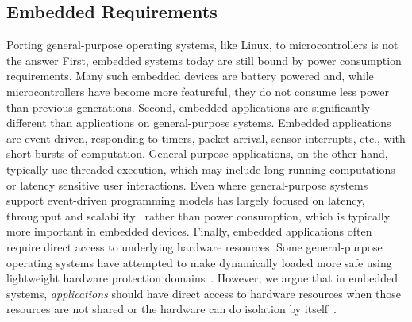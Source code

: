 \subsection{Embedded Requirements}
\label{sec:os:execution}

Porting general-purpose operating systems, like Linux, to microcontrollers is
not the answer First, embedded systems today are still bound by power
consumption requirements. Many such embedded devices are battery powered and,
while microcontrollers have become more featureful, they do not consume less
power than previous generations.  Second, embedded applications are
significantly different than applications on general-purpose systems. Embedded
applications are event-driven, responding to timers, packet arrival, sensor
interrupts, etc., with short bursts of computation. General-purpose
applications, on the other hand, typically use
threaded execution, which may include long-running computations or latency
sensitive user interactions. Even where general-purpose systems support
event-driven programming models has largely focused on
latency, throughput and scalability~\cite{epoll,libasync,ninja} rather than
power consumption, which is typically more important in embedded devices.
Finally, embedded applications often require direct access to underlying
hardware resources. Some general-purpose operating systems have attempted to
make dynamically loaded more safe using lightweight hardware protection
domains~\cite{nooks}. However, we argue that in embedded systems,
\emph{applications} should have direct access to hardware resources when those
resources are not shared or the hardware can do isolation by
itself~\cite{ix:osdi2014}.


